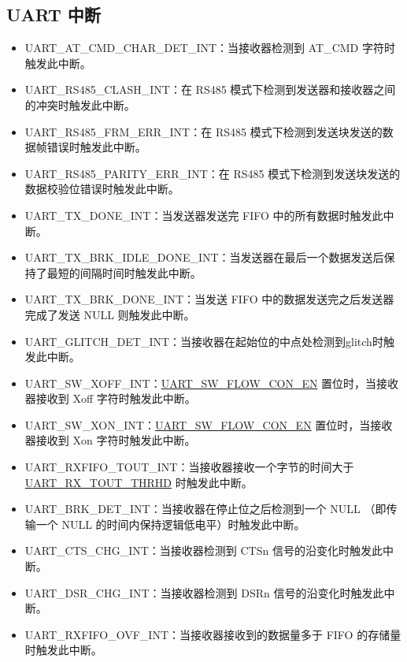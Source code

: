 \documentclass[main\_\_CN.tex]{subfiles}
\begin{document}
\subsection{UART 中断}
\begin{itemize}
\item \label{int:UARTATCMDCHARDETINT}UART\_AT\_CMD\_CHAR\_DET\_INT：当接收器检测到 AT\_CMD 字符时触发此中断。
\item \label{int:UARTRS485CLASHINT}UART\_RS485\_CLASH\_INT：在 RS485 模式下检测到发送器和接收器之间的冲突时触发此中断。
\item \label{int:UARTRS485FRMERRINT}UART\_RS485\_FRM\_ERR\_INT：在 RS485 模式下检测到发送块发送的数据帧错误时触发此中断。
\item \label{int:UARTRS485PARITYERRINT}UART\_RS485\_PARITY\_ERR\_INT：在 RS485 模式下检测到发送块发送的数据校验位错误时触发此中断。
\item \label{int:UARTTXDONEINT}UART\_TX\_DONE\_INT：当发送器发送完 FIFO 中的所有数据时触发此中断。
\item \label{int:UARTTXBRKIDLEDONEINT}UART\_TX\_BRK\_IDLE\_DONE\_INT：当发送器在最后一个数据发送后保持了最短的间隔时间时触发此中断。
\item \label{int:UARTTXBRKDONEINT}UART\_TX\_BRK\_DONE\_INT：当发送 FIFO 中的数据发送完之后发送器完成了发送 NULL 则触发此中断。
\item \label{int:UARTGLITCHDETINT}UART\_GLITCH\_DET\_INT：当接收器在起始位的中点处检测到glitch时触发此中断。
\item \label{int:UARTSWXOFFINT}UART\_SW\_XOFF\_INT：\hyperref[fielddesc:UARTSWFLOWCONEN]{UART\_SW\_FLOW\_CON\_EN} 置位时，当接收器接收到 Xoff 字符时触发此中断。
\item \label{int:UARTSWXONINT}UART\_SW\_XON\_INT：\hyperref[fielddesc:UARTSWFLOWCONEN]{UART\_SW\_FLOW\_CON\_EN} 置位时，当接收器接收到 Xon 字符时触发此中断。
\item \label{int:UARTRXFIFOTOUTINT}UART\_RXFIFO\_TOUT\_INT：当接收器接收一个字节的时间大于 \hyperref[fielddesc:UARTRXTOUTTHRHD]{UART\_RX\_TOUT\_THRHD} 时触发此中断。
\item \label{int:UARTBRKDETINT}UART\_BRK\_DET\_INT：当接收器在停止位之后检测到一个 NULL （即传输一个 NULL 的时间内保持逻辑低电平）时触发此中断。
\item \label{int:UARTCTSCHGINT}UART\_CTS\_CHG\_INT：当接收器检测到 CTSn 信号的沿变化时触发此中断。
\item \label{int:UARTDSRCHGINT}UART\_DSR\_CHG\_INT：当接收器检测到 DSRn 信号的沿变化时触发此中断。
\item \label{int:UARTRXFIFOOVFINT}UART\_RXFIFO\_OVF\_INT：当接收器接收到的数据量多于 FIFO 的存储量时触发此中断。

\end{itemize}
\end{document}
